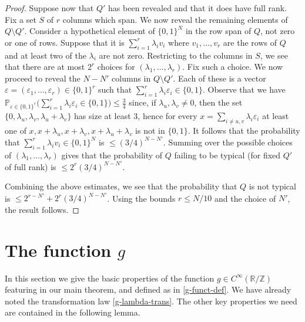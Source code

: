 \documentclass[11pt,reqno]{amsart}
\numberwithin{equation}{section}
\theoremstyle{definition}
\theoremstyle{remark}
\newcommand{\mb}{\mathbb}
\newcommand{\eps}{\varepsilon}
\renewcommand{\le}{\leqslant}
\newcommand\Z{\mathbb{Z}}
\newcommand\R{\mathbb{R}}
\begin{document}
\begin{proof}
Suppose now that $Q'$ has been revealed and that it does have full rank. Fix a set $S$ of $r$ columns which span. We now reveal the remaining elements of $Q \setminus Q'$. Consider a hypothetical element of $\{0,1\}^N$ in the row span of $Q$, not zero or one of rows. Suppose that it is $\sum_{i = 1}^r \lambda_i v_i$ where $v_1,\dots, v_r$ are the rows of $Q$ and at least two of the $\lambda_i$ are not zero. Restricting to the columns in $S$, we see that there are at most $2^r$ choices for $(\lambda_1,\dots, \lambda_r)$. Fix such a choice. We now proceed to reveal the $N - N'$ columns in $Q \setminus Q'$. Each of these is a vector $\eps = (\eps_1,\dots, \eps_r) \in \{0,1\}^r$ such that $\sum_{i = 1}^r \lambda_i \eps_i \in \{0,1\}$. Observe that we have $\mb{P}_{\eps \in \{0,1\}^r} \big(\sum_{i = 1}^r \lambda_i \eps_i \in \{0,1\}\big) \le \frac{3}{4}$ since, if $\lambda_u,\lambda_v \ne 0$, then the set $\{0, \lambda_u ,\lambda_v, \lambda_u + \lambda_v\}$ has size at least $3$, hence for every $x = \sum_{i \ne u,v} \lambda_i \eps_i$ at least one of $x, x+ \lambda_u,x + \lambda_v, x + \lambda_u + \lambda_v$ is not in $\{0,1\}$. It follows that the probability that $\sum_{i = 1}^r \lambda_i v_i  \in \{0,1\}^N$ is $\le (3/4)^{N - N'}$. Summing over the possible choices of $(\lambda_1,\dots, \lambda_r)$ gives that the probability of $Q$ failing to be typical (for fixed $Q'$ of full rank) is $\le 2^r (3/4)^{N - N'}$.

Combining the above estimates, we see that the probability that $Q$ is not typical is $\le 2^{r - N'} +2^r (3/4)^{N - N'}$. Using the bounds $r \le N/10$ and the choice of $N'$, the result follows.
\end{proof}


\section{The function \texorpdfstring{$g$}{}}\label{g-function-sec}

In this section we give the basic properties of the function $g \in C^{\infty}(\R/\Z)$ featuring in our main theorem, and defined as in \cref{g-funct-def}. We have already noted the transformation law \cref{g-lambda-trans}. The other key properties we need are contained in the following lemma.
\end{document}
